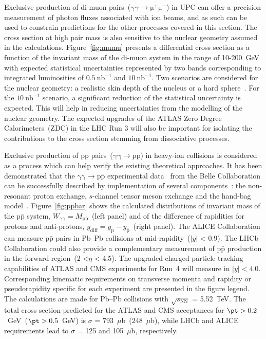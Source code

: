 Exclusive production of di-muon pairs~($\mathrm{\gamma\gamma\rightarrow \mu^+\mu^-}$) in UPC can offer a precision measurement of photon fluxes associated with ion beams, and as such can be used to constrain predictions for the other processes covered in this section. The cross section at high pair mass is also sensitive to the nuclear geometry assumed in the calculations. Figure~\ref{fig:mumu} presents a differential cross section as a function of the invariant mass of the di-muon system in the range of 10-200~GeV with expected statistical uncertainties represented by two bands corresponding to integrated luminosities of $0.5~\mathrm{nb}^{-1}$ and
$10~\mathrm{nb}^{-1}$. Two scenarios are considered for the nuclear
geometry: a realistic skin depth of the nucleus or a hard sphere~\cite{Barrett:1977}.
For the $10~\mathrm{nb}^{-1}$ scenario, a significant reduction of the statistical uncertainty is expected. 
This will help in reducing uncertainties from the modelling of the nuclear geometry.
The expected upgrades of the ATLAS Zero Degree Calorimeters~(ZDC) in the LHC Run 3 will also be important for isolating the contributions to the cross section stemming from dissociative processes.

Exclusive production of p$\mathrm{\bar{p}}$ pairs~($\mathrm{\gamma\gamma\rightarrow p\bar{p}}$) in heavy-ion collisions is considered as a process which can help verify the existing theoretical approaches. It has been demonstrated that the  $\mathrm{\gamma\gamma\rightarrow p\bar{p}}$ experimental data~\cite{Kuo:2005nr} from the Belle Collaboration can be successfully described by implementation of several components~\cite{Klusek-Gawenda:2017lgt}: the non-resonant proton exchange, $s$-channel tensor meson exchange and the hand-bag model~\cite{Diehl:2002yh}. Figure~\ref{fig:ppbar} shows the calculated distributions of invariant mass of the p$\mathrm{\bar{p}}$ system, $W_{\mathrm{\gamma\gamma}} = M_{\mathrm{p\bar{p}}}$~(left panel) and of the difference of rapidities for protons and anti-protons, $y_{\mathrm{diff}} = y_\mathrm{p} - y_{\mathrm{\bar{p}}}$~(right panel).
The ALICE Collaboration can measure p$\mathrm{\bar{p}}$ pairs in Pb--Pb collisions at mid-rapidity~($|y|$ < 0.9). 
The LHCb Collaboration could also provide a complementary measurement of p$\mathrm{\bar{p}}$ production in the forward region~(2 <$\eta$ < 4.5).
The upgraded charged particle tracking capabilities of ATLAS and CMS experiments for Run~4 will measure in $|y|<4.0$.
Corresponding kinematic requirements on transverse momenta and rapidity or pseudorapidity specific for each experiment are presented in the figure legend. The calculations are made for Pb--Pb collisions with $\sqrt{s_{\mathrm{NN}}}$ = 5.52~TeV.
The total cross section predicted for the ATLAS and CMS acceptances for $\pt>0.2$~GeV~($\pt>0.5$~GeV) is $\sigma$ = 793~$\mu$b~(248~$\mu$b), while LHCb and ALICE requirements lead to $\sigma$ = 125 and 105~$\mu$b, respectively.


